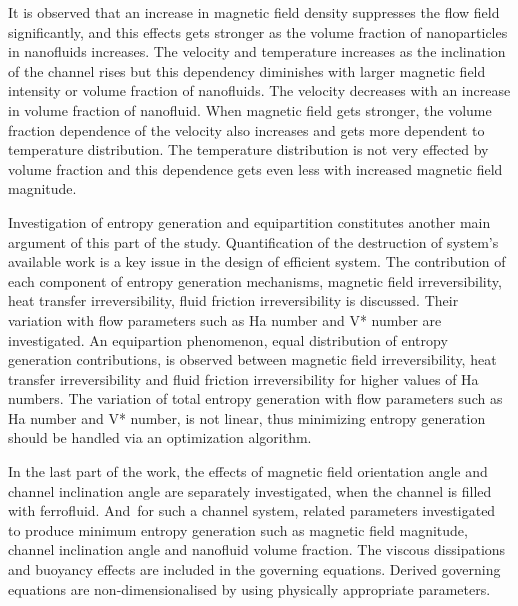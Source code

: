 It is observed that an increase in magnetic field density suppresses the flow field significantly, and this effects gets stronger as the volume fraction of nanoparticles in nanofluids increases. The velocity and temperature increases as the inclination of the channel rises but this dependency diminishes with larger magnetic field intensity or volume fraction of nanofluids. The velocity decreases with an increase in volume fraction of nanofluid. When magnetic field gets stronger, the volume fraction dependence of the velocity also increases and gets more dependent to temperature distribution.  The temperature distribution is not very effected by volume fraction and this dependence gets even less with increased magnetic field magnitude.

Investigation of entropy generation and equipartition constitutes another main argument of this part of the study. Quantification of the destruction of system's available work is a key issue in the design of efficient system. The contribution of each component of entropy generation mechanisms, magnetic field irreversibility, heat transfer irreversibility, fluid friction irreversibility is discussed. Their variation with flow parameters such as Ha number and V* number are investigated. An equipartion phenomenon, equal distribution of entropy generation contributions, is observed between magnetic field irreversibility, heat transfer irreversibility and fluid friction irreversibility for higher values of Ha numbers. The variation of total entropy generation with flow parameters such as Ha number and V* number, is not linear, thus minimizing entropy generation should be handled via an optimization algorithm.

In the last part of the work, the effects of magnetic field orientation angle and channel inclination angle are separately investigated, when the channel is filled with ferrofluid.  And~for such a channel system, related parameters investigated to produce minimum entropy generation such as magnetic field magnitude, channel inclination angle and nanofluid volume fraction. The viscous dissipations and buoyancy effects are included in the governing equations. Derived governing equations are non-dimensionalised by using physically appropriate parameters. 

